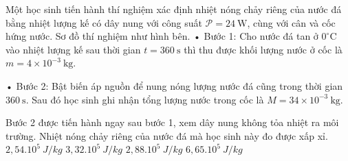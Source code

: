 \begin{ex}
Một học sinh tiến hành thí nghiệm xác định nhiệt nóng chảy riêng của nước đá bằng nhiệt lượng kế có dây nung với công suất $\mathcal{P} = 24\ \mathrm{W}$, cùng với cân và cốc hứng nước. Sơ đồ thí nghiệm như hình bên. 
 • Bước 1: Cho nước đá tan ở $0^\circ \mathrm{C}$ vào nhiệt lượng kế sau thời gian $t = 360\ \mathrm{s}$ thì thu được khối lượng nước ở cốc là $m = 4 \times 10^{-3}\ \mathrm{kg}$.
 
 • Bước 2: Bật biến áp nguồn để nung nóng lượng nước đá cũng trong thời gian $360\ \mathrm{s}$. Sau đó học sinh ghi nhận tổng lượng nước trong cốc là $M = 34 \times 10^{-3}\ \mathrm{kg}$.
 
 Bước 2 được tiến hành ngay sau bước 1, xem dây nung không tỏa nhiệt ra môi trường. Nhiệt nóng chảy riêng của nước đá mà học sinh này đo được xấp xỉ.
\choice
{$2,54.10^5\ J/kg$}
{\True $3,32.10^5\ J/kg$}
{$2,88.10^5\ J/kg$}
{$6,65.10^5\ J/kg$}
\end{ex}
